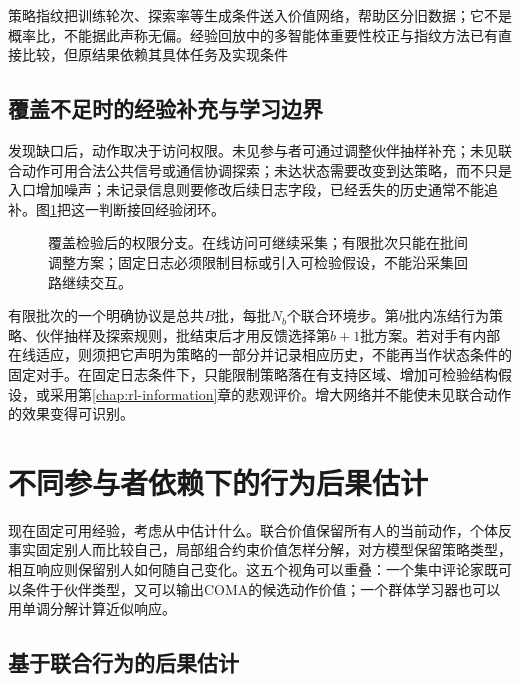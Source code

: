 策略指纹把训练轮次、探索率等生成条件送入价值网络，帮助区分旧数据；它不是概率比，不能据此声称无偏。经验回放中的多智能体重要性校正与指纹方法已有直接比较，但原结果依赖其具体任务及实现条件

\subsection{覆盖不足时的经验补充与学习边界}
\label{sec:rl-multi-agent-data-boundary}

发现缺口后，动作取决于访问权限。未见参与者可通过调整伙伴抽样补充；未见联合动作可用合法公共信号或通信协调探索；未达状态需要改变到达策略，而不只是入口增加噪声；未记录信息则要修改后续日志字段，已经丢失的历史通常不能追补。图\ref{fig:rl-multi-agent-data-loop}把这一判断接回经验闭环。

\begin{figure}[htbp]
 \centering
 
 \caption{覆盖检验后的权限分支。在线访问可继续采集；有限批次只能在批间调整方案；固定日志必须限制目标或引入可检验假设，不能沿采集回路继续交互。}
 \label{fig:rl-multi-agent-data-loop}
\end{figure}

有限批次的一个明确协议是总共$B$批，每批$N_b$个联合环境步。第$b$批内冻结行为策略、伙伴抽样及探索规则，批结束后才用反馈选择第$b+1$批方案。若对手有内部在线适应，则须把它声明为策略的一部分并记录相应历史，不能再当作状态条件的固定对手。在固定日志条件下，只能限制策略落在有支持区域、增加可检验结构假设，或采用第\ref{chap:rl-information}章的悲观评价。增大网络并不能使未见联合动作的效果变得可识别。

\section{不同参与者依赖下的行为后果估计}
\label{sec:rl-multi-agent-estimation}

现在固定可用经验，考虑从中估计什么。联合价值保留所有人的当前动作，个体反事实固定别人而比较自己，局部组合约束价值怎样分解，对方模型保留策略类型，相互响应则保留别人如何随自己变化。这五个视角可以重叠：一个集中评论家既可以条件于伙伴类型，又可以输出COMA的候选动作价值；一个群体学习器也可以用单调分解计算近似响应。

\subsection{基于联合行为的后果估计}
\label{sec:rl-multi-agent-joint-value}

